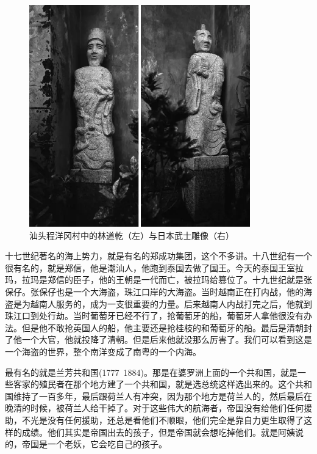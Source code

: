 \begin{figure}
	\centering
	\includegraphics[width=\textwidth]{images/image-67}
	\caption{汕头程洋冈村中的林道乾（左）与日本武士雕像（右）}
\end{figure}

十七世纪著名的海上势力，就是有名的郑成功集团，这个不多讲。十八世纪有一个很有名的，就是郑信，他是潮汕人，他跑到泰国去做了国王。今天的泰国王室拉玛，拉玛是郑信的臣子，他的王朝是一代而亡，被拉玛给篡位了。十九世纪就是张保仔。张保仔也是一个大海盗，珠江口岸的大海盗。当时越南正在打内战，他的海盗是为越南人服务的，成为一支很重要的力量。后来越南人内战打完之后，他就到珠江口到处行劫。当时葡萄牙已经不行了，抢葡萄牙的船，葡萄牙人拿他很没有办法。但是他不敢抢英国人的船，他主要还是抢桂枝的和葡萄牙的船。最后是清朝封了他一个大官，他就投降了清朝。但是后来他就没那么厉害了。我们可以看到这是一个海盗的世界，整个南洋变成了南粤的一个内海。

最有名的就是兰芳共和国(1777~1884)。那是在婆罗洲上面的一个共和国，就是一些客家的殖民者在那个地方建了一个共和国，就是选总统这样选出来的。这个共和国维持了一百多年，最后跟荷兰人有冲突，因为那个地方是荷兰人的，然后最后在晚清的时候，被荷兰人给干掉了。对于这些伟大的航海者，帝国没有给他们任何援助，不光是没有任何援助，还总是看他们不顺眼，他们完全是靠自力更生取得了这样的成绩。他们其实是帝国出去的孩子，但是帝国就会想吃掉他们。就是阿姨说的，帝国是一个老妖，它会吃自己的孩子。

